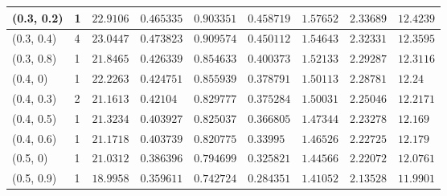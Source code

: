 \begin{center}
{\begin{longtable}{| l | p{} |  p{} | p{} | p{} | p{} | p{} | p{} | p{} |}
 (0.3, 0.2) & 1  & $22.9106$ & $0.465335$ & $0.903351$ & $0.458719$ & $1.57652$ & $2.33689$ & $12.4239$ \\ \hline
 (0.3, 0.4) & 4  & $23.0447$ & $0.473823$ & $0.909574$ & $0.450112$ & $1.54643$ & $2.32331$ & $12.3595$ \\ \hline
 (0.3, 0.8) & 1  & $21.8465$ & $0.426339$ & $0.854633$ & $0.400373$ & $1.52133$ & $2.29287$ & $12.3116$ \\ \hline
 (0.4, 0) & 1  & $22.2263$ & $0.424751$ & $0.855939$ & $0.378791$ & $1.50113$ & $2.28781$ & $12.24$ \\ \hline
 (0.4, 0.3) & 2  & $21.1613$ & $0.42104$ & $0.829777$ & $0.375284$ & $1.50031$ & $2.25046$ & $12.2171$ \\ \hline
 (0.4, 0.5) & 1  & $21.3234$ & $0.403927$ & $0.825037$ & $0.366805$ & $1.47344$ & $2.23278$ & $12.169$ \\ \hline
 (0.4, 0.6) & 1  & $21.1718$ & $0.403739$ & $0.820775$ & $0.33995$ & $1.46526$ & $2.22725$ & $12.179$ \\ \hline
 (0.5, 0) & 1  & $21.0312$ & $0.386396$ & $0.794699$ & $0.325821$ & $1.44566$ & $2.22072$ & $12.0761$ \\ \hline
 (0.5, 0.9) & 1  & $18.9958$ & $0.359611$ & $0.742724$ & $0.284351$ & $1.41052$ & $2.13528$ & $11.9901$ \\ \hline
\end{longtable}

}
\end{center}
